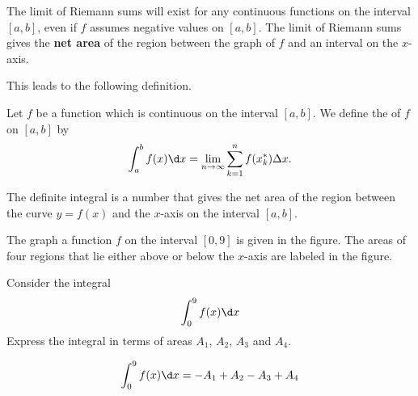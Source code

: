 \documentclass{ximera}
\begin{document}
The limit of Riemann sums will exist for any continuous functions on the interval $[a,b]$, even if $f$ assumes negative values on $[a,b]$.
The limit of Riemann sums  gives the  \textbf{net area} of the region between the graph of $f$ and an interval on the $x$- axis.

This leads to the following definition.
\begin{definition}
Let $f$ be a function which is continuous on the interval $[a,b]$. We define the  of $f$ on $[a,b]$ by
\[
\int_a^b f(x) \d x=\lim_{n\to\infty}\sum_{k=1}^n f(x_k^*)\Delta x.
\]
\end{definition}
The definite integral is a number that gives the net area of the region between the curve $y=f(x)$ and the $x$-axis on the interval $[a,b]$.  
 
\begin{example} The graph a function $f$ on the interval $[0,9]$ is given in the figure. The areas of  four regions that lie either above or below the $x$-axis are labeled in the figure.

 \begin{image}
\end{image}
Consider the integral
\[
\int_0^9 f(x) \d x
\]
Express the integral in terms of areas $A_1$, $A_2$, $A_3$ and $A_4$.
\begin{explanation}
\begin{align*}
    \int_0^9 f(x) \d x&= -A_1+A_2-A_3+A_4\\
\end{align*}

\end{explanation}
\end{example}
\end{document}
